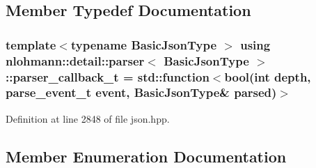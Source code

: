 \subsection{Member Typedef Documentation}
\subsubsection[{\texorpdfstring{parser\+\_\+callback\+\_\+t}{parser_callback_t}}]{\setlength{\rightskip}{0pt plus 5cm}template$<$typename Basic\+Json\+Type $>$ using {\bf nlohmann\+::detail\+::parser}$<$ Basic\+Json\+Type $>$\+::{\bf parser\+\_\+callback\+\_\+t} =  std\+::function$<$bool(int depth, {\bf parse\+\_\+event\+\_\+t} event, Basic\+Json\+Type\& parsed)$>$}\hypertarget{classnlohmann_1_1detail_1_1parser_ad250ad4f2b4af4a497e727c963162ff1}{}\label{classnlohmann_1_1detail_1_1parser_ad250ad4f2b4af4a497e727c963162ff1}


Definition at line 2848 of file json.\+hpp.



\subsection{Member Enumeration Documentation}
